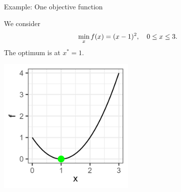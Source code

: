 \documentclass[11pt,compress,t,notes=noshow,xcolor=table]{beamer}
\begin{document}
\begin{vbframe}{Example: One objective function}

We consider 
\[
\min_{x} f(x) = (x - 1)^2, 
\quad 0 \le x \le 3.
\]
The optimum is at \(x^* = 1\).

\begin{center}
\includegraphics[width=0.5\textwidth]{slides/11-multicrit/figure_man/graph1.png}
\end{center}

\end{vbframe}
\end{document}
